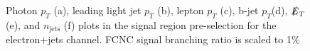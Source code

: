 \begin{figure}[h!]
\hfil
{}
\caption{Photon $p_T$ (a), leading light jet $p_T$ (b), lepton $p_T$ (c), b-jet $p_T$(d), $\slashed{E}_T$ (e), and $n_{\text{jets}}$ (f) plots in the signal region pre-selection for the electron+jets channel.  FCNC signal branching ratio is scaled to 1\% }
\label{fig:PreSelPlots2}
\end{figure}


